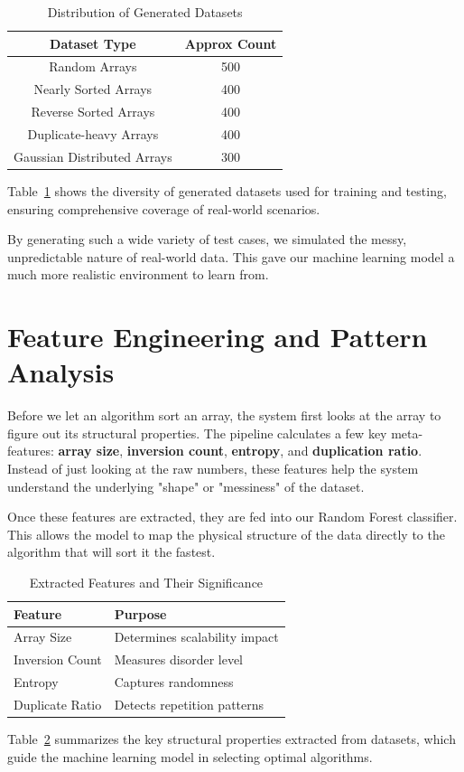 \documentclass[12pt,a4paper,oneside,openany]{report}
\begin{document}
\begin{table}[H]
\centering
\begin{tabular}{cc}
\toprule
\textbf{Dataset Type} & \textbf{Approx Count} \\
\midrule
Random Arrays & 500 \\
Nearly Sorted Arrays & 400 \\
Reverse Sorted Arrays & 400 \\
Duplicate-heavy Arrays & 400 \\
Gaussian Distributed Arrays & 300 \\
\bottomrule
\end{tabular}
\caption{Distribution of Generated Datasets}
\label{tab:dataset}
Table~\ref{tab:dataset} shows the diversity of generated datasets used for training and testing, ensuring comprehensive coverage of real-world scenarios.
\end{table}
By generating such a wide variety of test cases, we simulated the messy, unpredictable nature of real-world data. This gave our machine learning model a much more realistic environment to learn from.

\section{Feature Engineering and Pattern Analysis}
Before we let an algorithm sort an array, the system first looks at the array to figure out its structural properties. The pipeline calculates a few key meta-features: \textbf{array size}, \textbf{inversion count}, \textbf{entropy}, and \textbf{duplication ratio}. Instead of just looking at the raw numbers, these features help the system understand the underlying "shape" or "messiness" of the dataset.

Once these features are extracted, they are fed into our Random Forest classifier. This allows the model to map the physical structure of the data directly to the algorithm that will sort it the fastest.

\begin{table}[H]
\centering
\begin{tabular}{ll}
\toprule
\textbf{Feature} & \textbf{Purpose} \\
\midrule
Array Size      & Determines scalability impact \\
Inversion Count & Measures disorder level \\
Entropy         & Captures randomness \\
Duplicate Ratio & Detects repetition patterns \\
\bottomrule
\end{tabular}
\caption{Extracted Features and Their Significance}
\label{tab:features}

\vspace{0.3cm}
\small
Table~\ref{tab:features} summarizes the key structural properties extracted from datasets, which guide the machine learning model in selecting optimal algorithms.
\end{table}
\end{document}
